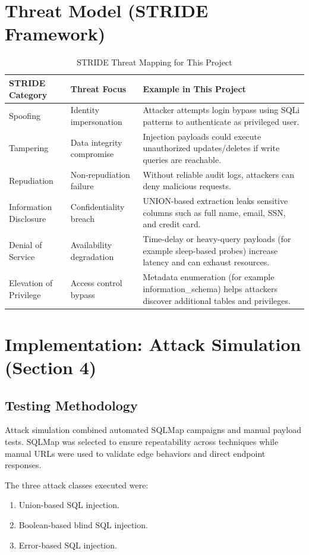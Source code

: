 \documentclass[12pt,a4paper]{article}
\begin{document}
\section{Threat Model (STRIDE Framework)}
\begin{table}[H]
\centering
\caption{STRIDE Threat Mapping for This Project}
\begin{tabular}{p{} p{} p{}}
\toprule
\textbf{STRIDE Category} & \textbf{Threat Focus} & \textbf{Example in This Project} \\
\midrule
Spoofing & Identity impersonation & Attacker attempts login bypass using SQLi patterns to authenticate as privileged user. \\
Tampering & Data integrity compromise & Injection payloads could execute unauthorized updates/deletes if write queries are reachable. \\
Repudiation & Non-repudiation failure & Without reliable audit logs, attackers can deny malicious requests. \\
Information Disclosure & Confidentiality breach & UNION-based extraction leaks sensitive columns such as full name, email, SSN, and credit card. \\
Denial of Service & Availability degradation & Time-delay or heavy-query payloads (for example sleep-based probes) increase latency and can exhaust resources. \\
Elevation of Privilege & Access control bypass & Metadata enumeration (for example information\_schema) helps attackers discover additional tables and privileges. \\
\bottomrule
\end{tabular}
\end{table}

\section{Implementation: Attack Simulation (Section 4)}
\subsection{Testing Methodology}
Attack simulation combined automated SQLMap campaigns and manual payload tests. SQLMap was selected to ensure repeatability across techniques while manual URLs were used to validate edge behaviors and direct endpoint responses.

The three attack classes executed were:
\begin{enumerate}
  \item Union-based SQL injection.
  \item Boolean-based blind SQL injection.
  \item Error-based SQL injection.
\end{enumerate}
\end{document}
